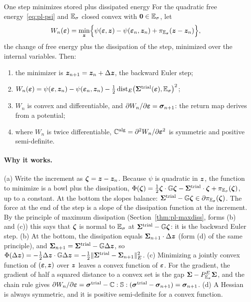 \begin{gbox}{One step minimizes stored plus dissipated energy}\label{thm:pn-W}
For the quadratic free energy~\eqref{eq:pl-psi} and $\mathbb{E}_{\sigma}$ closed convex with
$\bm{0}\in\mathbb{E}_{\sigma}$, let
\begin{equation}\label{eq:pn-Wn}
  W_n(\bm{\varepsilon})=\min_{\bm{z}}\Bigl\{\psi(\bm{\varepsilon},\bm{z})-\psi(\bm{\varepsilon}_n,\bm{z}_n)+\pi_{\mathbb{E}_{\sigma}}(\bm{z}-\bm{z}_n)\Bigr\},
\end{equation}
the change of free energy plus the dissipation of the step, minimized over the
internal variables. Then:
\begin{enumerate}[label=(\alph*)]
  \item the minimizer is $\bm{z}_{n+1}=\bm{z}_n+\Delta\bm{z}$, the backward Euler step;
  \item $W_n(\bm{\varepsilon})=\psi(\bm{\varepsilon},\bm{z}_n)-\psi(\bm{\varepsilon}_n,\bm{z}_n)-\tfrac12\,\mathrm{dist}_E\bigl(\bm{\Sigma}^{\mathrm{trial}}(\bm{\varepsilon}),\mathbb{E}_{\sigma}\bigr)^2$;
  \item $W_n$ is convex and differentiable, and
  $\partial W_n/\partial\bm{\varepsilon}=\bm{\sigma}_{n+1}$: the return map derives from a potential;
  \item where $W_n$ is twice differentiable,
  $\mathbb{C}^{\mathrm{alg}}=\partial^2W_n/\partial\bm{\varepsilon}^2$ is symmetric and positive
  semi-definite.
\end{enumerate}
\end{gbox}
\paragraph{Why it works.} (a) Write the increment as $\bm{\zeta}=\bm{z}-\bm{z}_n$.
Because $\psi$ is quadratic in $\bm{z}$, the function to minimize is a bowl plus
the dissipation,
$\Phi(\bm{\zeta})=\tfrac12\bm{\zeta}\cdot\mathbb{G}\bm{\zeta}-\bm{\Sigma}^{\mathrm{trial}}\cdot\bm{\zeta}+\pi_{\mathbb{E}_{\sigma}}(\bm{\zeta})$,
up to a constant. At the bottom the slopes balance:
$\bm{\Sigma}^{\mathrm{trial}}-\mathbb{G}\bm{\zeta}\in\partial\pi_{\mathbb{E}_{\sigma}}(\bm{\zeta})$. The force
at the end of the step is a slope of the dissipation function at the
increment. By the principle of maximum dissipation (Section~\ref{thm:pl-maxdiss},
forms (b) and (c)) this says that $\bm{\zeta}$ is normal to $\mathbb{E}_{\sigma}$ at
$\bm{\Sigma}^{\mathrm{trial}}-\mathbb{G}\bm{\zeta}$: it is the backward Euler step.
(b) At the bottom, the dissipation equals $\bm{\Sigma}_{n+1}\cdot\Delta\bm{z}$ (form (d)
of the same principle), and $\bm{\Sigma}_{n+1}=\bm{\Sigma}^{\mathrm{trial}}-\mathbb{G}\Delta\bm{z}$, so
$\Phi(\Delta\bm{z})=-\tfrac12\Delta\bm{z}\cdot\mathbb{G}\Delta\bm{z}=-\tfrac12\lVert \bm{\Sigma}^{\mathrm{trial}}-\bm{\Sigma}_{n+1}\rVert_E^2$.
(c) Minimizing a jointly convex function of $(\bm{\varepsilon},\bm{z})$ over $\bm{z}$ leaves a
convex function of $\bm{\varepsilon}$. For the gradient, the gradient of half a squared
distance to a convex set is the gap $\bm{\Sigma}-P^E_{\mathbb{E}_{\sigma}}\bm{\Sigma}$, and the chain
rule gives
$\partial W_n/\partial\bm{\varepsilon}=\bm{\sigma}^{\mathrm{trial}}-\mathbb{C}:\mathbb{S}:(\bm{\sigma}^{\mathrm{trial}}-\bm{\sigma}_{n+1})=\bm{\sigma}_{n+1}$.
(d) A Hessian is always symmetric, and it is positive semi-definite for a
convex function.

